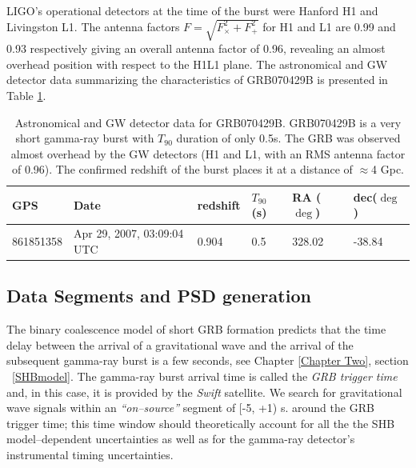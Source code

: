 LIGO's operational detectors at the time of the burst were Hanford H1 and Livingston L1. The antenna factors $F = \sqrt{F_{\times}^2+F_+^2}$ for H1 and L1 are 0.99 and 0.93 respectively giving an overall antenna factor of 0.96, revealing an almost overhead position with respect to the H1L1 plane. The astronomical and GW detector data summarizing the characteristics of GRB070429B is presented in Table \ref{Table_grb070429b}.

\begin{table}[ht]
 \begin{tabular}{|l|l|l|l|l|l|}
 \hline
 \hline
 GPS & Date & redshift & $T_{90}$ (s) & RA ($\deg$) & dec($\deg$) \\
 \hline
 861851358 & Apr 29, 2007, 03:09:04 UTC & 0.904 & 0.5 & 328.02 & -38.84 \\
 \hline
 \hline
 \end{tabular}
 \caption{Astronomical and GW detector data for GRB070429B. GRB070429B is a very short gamma-ray burst with $T_{90}$ duration of only 0.5s. The GRB was observed almost overhead by the GW detectors (H1 and L1, with an RMS antenna factor of 0.96). The confirmed redshift of the burst places it at a distance of $\approx$4 Gpc.}
 \label{Table_grb070429b}
\end{table}

\subsection{Data Segments and PSD generation}
\label{grb070429bsegments}

The binary coalescence model of short GRB formation predicts that the time delay between the arrival of a gravitational wave and the arrival of the subsequent gamma-ray burst is a few seconds, see Chapter \ref{Chapter Two}, section ~\ref{SHBmodel}. The gamma-ray burst arrival time is called the \emph{GRB trigger time} and, in this case, it is provided by the \emph{Swift} satellite. We search for gravitational wave signals within an \emph{``on--source''} segment of [-5, +1) s. around the GRB trigger time; this time window should theoretically account for all the the SHB model--dependent uncertainties as well as for the gamma-ray detector's instrumental timing uncertainties.

